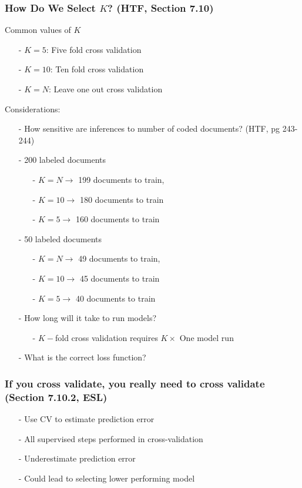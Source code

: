 \documentclass{beamer}
\begin{document}
\begin{frame}
\frametitle{How Do We Select $K$? (HTF, Section 7.10)  }

Common values of $K$ 
\begin{itemize}
\item[-] $K = 5$: Five fold cross validation
\item[-] $K = 10$: Ten fold cross validation
\item[-] $K = N $: Leave one out cross validation
\end{itemize}

Considerations:
\begin{itemize}
\item[-] How sensitive are inferences to number of coded documents? (HTF, pg 243-244) 
\item[-] 200 labeled documents 
\begin{itemize}
\item[-] $K= N \rightarrow$ 199 documents to train, 
\item[-] $K = 10 \rightarrow$ 180 documents to train
\item[-] $K = 5 \rightarrow$ 160 documents to train
\end{itemize}
\item[-] 50 labeled documents
\begin{itemize}
\item[-] $K= N \rightarrow$ 49 documents to train, 
\item[-] $K = 10 \rightarrow$ 45 documents to train
\item[-] $K = 5 \rightarrow$ 40 documents to train
\end{itemize}
\item[-] How long will it take to run models?  
\begin{itemize}
\item[-] $K-$fold cross validation requires $K \times $ One model run 
\end{itemize}
\item[-] What is the correct loss function?
\end{itemize}
\end{frame}


\begin{frame}
\frametitle{If you cross validate, you really need to cross validate (Section 7.10.2, ESL)} 

\begin{itemize}
\item[-] Use CV to estimate prediction error
\item[-] \alert{All} supervised steps performed in cross-validation
\item[-] \alert{Underestimate} prediction error
\item[-] \alert{Could lead to selecting lower performing model} 
\end{itemize} 

\end{frame}
\end{document}
